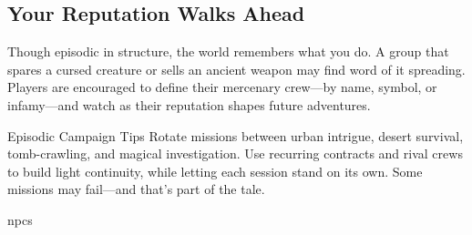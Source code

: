\subsection*{Your Reputation Walks Ahead}

Though episodic in structure, the world remembers what you do. A group that spares a cursed creature or sells an ancient weapon may find word of it spreading. Players are encouraged to define their mercenary crew—by name, symbol, or infamy—and watch as their reputation shapes future adventures.

\begin{CommentBox}{Episodic Campaign Tips}
    Rotate missions between urban intrigue, desert survival, tomb-crawling, and magical investigation. Use recurring contracts and rival crews to build light continuity, while letting each session stand on its own. Some missions may fail—and that’s part of the tale.
\end{CommentBox}


{npcs}
